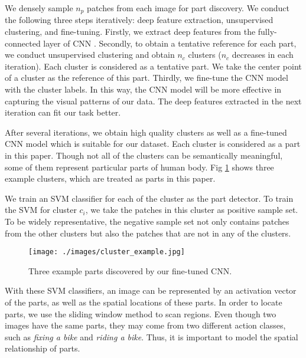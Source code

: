 \documentclass[journal]{IEEEtran}
\begin{document}
We densely sample $ n_p $ patches from each image for part discovery. We conduct the following three steps iteratively: deep feature extraction, unsupervised clustering, and fine-tuning.
Firstly, we extract deep features from the fully-connected layer of CNN \cite{CNN__NIPS2012_4824,jia2014caffe}. Secondly, to obtain a tentative reference for each part, we conduct unsupervised clustering and obtain $ n_c $ clusters ($ n_c $ decreases in each iteration). Each cluster is considered as a tentative part. We take the center point of a cluster as the reference of this part. Thirdly, we fine-tune the CNN model with the cluster labels. In this way, the CNN model will be more effective in capturing the visual patterns of our data. The deep features extracted in the next iteration can fit our task better.





After several iterations, we obtain high quality clusters as well as a fine-tuned CNN model which is suitable for our dataset. Each cluster is considered as a part in this paper. Though not all of the clusters can be semantically meaningful, some of them represent particular parts of human body. Fig \ref{fig:clusterExample} shows three example clusters, which are treated as parts in this paper.


We train an SVM classifier for each of the cluster as the part detector. To train the SVM for cluster $ c_i $, we take the patches in this cluster as positive sample set. To be widely representative, the negative sample set not only contains patches from the other clusters but also the patches that are not in any of the clusters.



\begin{figure}[t]
	\begin{center}
		\texttt{[image: ./images/cluster\_example.jpg]}
	\end{center}
	\caption{Three example parts discovered by our fine-tuned CNN. }
	\label{fig:clusterExample}
\end{figure}


With these SVM classifiers, an image can be represented by an activation vector of the parts, as well as the spatial locations of these parts. In order to locate parts, we use the sliding window method to scan regions. Even though two images have the same parts, they may come from two different action classes,  such as \textit{fixing a bike} and \textit{riding a bike}. Thus, it is important to model the spatial relationship of parts.
\end{document}
